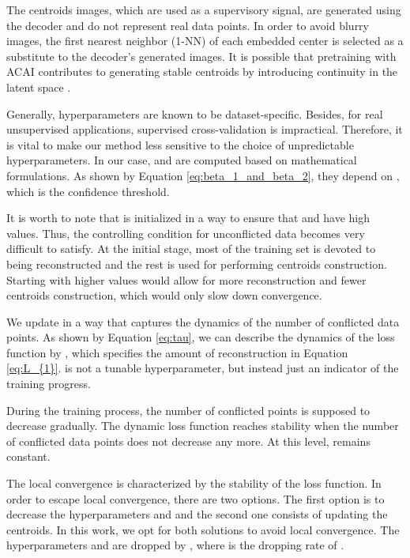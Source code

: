 \documentclass{article}
\begin{document}
The centroids images, which are used as a supervisory signal, are generated using the decoder and do not represent real data points. In order to avoid blurry images, the first nearest neighbor (1-NN) of each embedded center  is selected as a substitute to the decoder's generated images. It is possible that pretraining with ACAI contributes to generating stable centroids by introducing continuity in the latent space \cite{paper5}.

Generally, hyperparameters are known to be dataset-specific. Besides, for real unsupervised applications, supervised cross-validation is impractical. Therefore, it is vital to make our method less sensitive to the choice of unpredictable hyperparameters. In our case,  and  are computed based on mathematical formulations. As shown by Equation \ref{eq:beta_1_and_beta_2}, they depend on , which is the confidence threshold.  



It is worth to note that  is initialized in a way to ensure that  and  have high values. Thus, the controlling condition for unconflicted data becomes very difficult to satisfy. At the initial stage, most of the training set is devoted to being reconstructed and the rest is used for performing centroids construction. Starting with higher values would allow for more reconstruction and fewer centroids construction, which would only slow down convergence. 

We update  in a way that captures the dynamics of the number of conflicted data points. As shown by Equation \ref{eq:tau}, we can describe the dynamics of the loss function by , which specifies the amount of reconstruction in Equation \ref{eq:L_{1}}.  is not a tunable hyperparameter, but instead just an indicator of the training progress.



During the training process, the number of conflicted points is supposed to decrease gradually. The dynamic loss function reaches stability when the number of conflicted data points does not decrease any more. At this level,  remains constant.

The local convergence is characterized by the stability of the loss function. In order to escape local convergence, there are two options. The first option is to decrease the hyperparameters  and  and the second one consists of updating the centroids. In this work, we opt for both solutions to avoid local convergence. The hyperparameters  and  are dropped by , where  is the dropping rate of .
\end{document}
